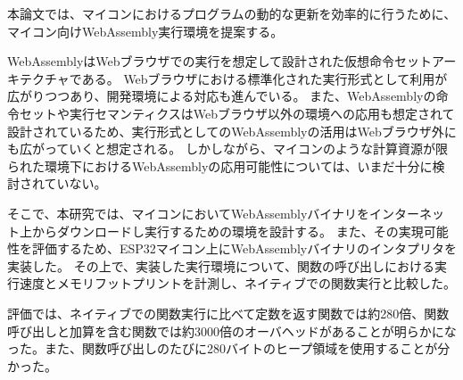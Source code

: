 \begin{jabstract}

本論文では、マイコンにおけるプログラムの動的な更新を効率的に行うために、マイコン向けWebAssembly実行環境を提案する。

WebAssemblyはWebブラウザでの実行を想定して設計された仮想命令セットアーキテクチャである。
Webブラウザにおける標準化された実行形式として利用が広がりつつあり、開発環境による対応も進んでいる。
また、WebAssemblyの命令セットや実行セマンティクスはWebブラウザ以外の環境への応用も想定されて設計されているため、実行形式としてのWebAssemblyの活用はWebブラウザ外にも広がっていくと想定される。
しかしながら、マイコンのような計算資源が限られた環境下におけるWebAssemblyの応用可能性については、いまだ十分に検討されていない。

そこで、本研究では、マイコンにおいてWebAssemblyバイナリをインターネット上からダウンロードし実行するための環境を設計する。
また、その実現可能性を評価するため、ESP32マイコン上にWebAssemblyバイナリのインタプリタを実装した。
その上で、実装した実行環境について、関数の呼び出しにおける実行速度とメモリフットプリントを計測し、ネイティブでの関数実行と比較した。

評価では、ネイティブでの関数実行に比べて定数を返す関数では約280倍、関数呼び出しと加算を含む関数では約3000倍のオーバヘッドがあることが明らかになった。また、関数呼び出しのたびに280バイトのヒープ領域を使用することが分かった。

\end{jabstract}
